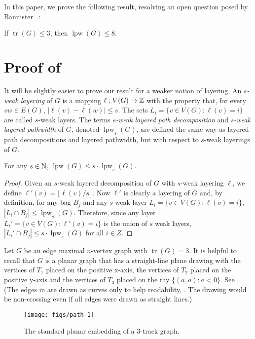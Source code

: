 \documentclass{patmorin}
\DeclareMathOperator{\tr}{tr}
\DeclareMathOperator{\lpw}{lpw}
\begin{document}
In this paper, we prove the following result, resolving an open question
posed by Bannister \etal\ \cite{bannister.devanny.ea:track}:

\begin{thm}
  If $\tr(G)\le 3$, then $\lpw(G)\le 8$.
\end{thm}

\section{Proof of }

It will be slightly easier to prove our result for a weaker notion
of layering.  An \emph{$s$-weak layering} of $G$ is a mapping
$\ell:V(G)\to\mathbb{Z}$ with the property that, for every $vw\in E(G)$,
$|\ell(v)-\ell(w)|\le s$.  The sets $L_i=\{v\in V(G): \ell(v)=i\}$
are called $s$-weak layers.  The terms \emph{$s$-weak layered path
decomposition} and \emph{$s$-weak layered pathwidth} of $G$, denoted
$\lpw_s(G)$, are defined the same way as layered path decompositions
and layered pathwidth, but with respect to $s$-weak layerings of $G$.

\begin{lem}
  For any $s\in\mathbb{N}$, $\lpw(G) \le s\cdot\lpw_s(G)$.
\end{lem}

\begin{proof}
  Given an $s$-weak layered decomposition of $G$ with $s$-weak layering
  $\ell$, we define $\ell'(v)=\lfloor\ell(v)/s\rfloor$. Now $\ell'$
  is clearly a layering of $G$ and, by definition, for any bag $B_j$
  and any $s$-weak layer $L_i=\{v\in V(G):\ell(v)=i\}$, $|L_i\cap B_j|\le
  \lpw_s(G)$.  Therefore, since any layer $L_i'=\{v\in V(G):\ell'(v)=i\}$
  is the union of $s$ weak layers, $|L_i'\cap B_j|\le s\cdot\lpw_s(G)$
  for all $i\in Z$.
\end{proof}

Let $G$ be an edge maximal $n$-vertex graph with $\tr(G)=3$.  It is
helpful to recall that $G$ is a planar graph that has a straight-line
plane drawing with the vertices of $T_1$ placed on the positive x-axis,
the vertices of $T_2$ placed on the positive y-axis and the vertices of
$T_3$ placed on the ray $\{(a,a):a<0\}$. See . (The
edges in  are drawn as curves only to help
readability, . The drawing would be non-crossing even if all edges were
drawn as straight lines.)

\begin{figure}
  \begin{center}
     \texttt{[image: figs/path-1]}
  \end{center}
  \caption{The standard planar embedding of a 3-track graph.}
\end{figure}
\end{document}
